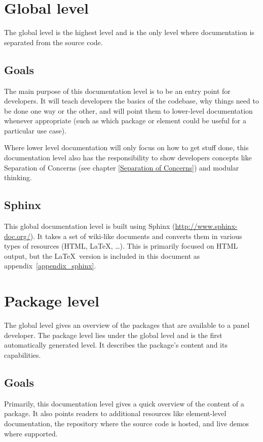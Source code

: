 \section{Global level}
The global level is the highest level and is the only level where documentation
is separated from the source code.

\subsection{Goals}
The main purpose of this documentation level is to be an entry point for developers.
It will teach developers the basics of the codebase, why things need to be done
one way or the other, and will point them to lower-level documentation whenever
appropriate (such as which package or element could be useful for a particular
use case).

Where lower level documentation will only focus on how to get stuff done, this
documentation level also has the responsibility to show developers concepts like
Separation of Concerns (see chapter \ref{Separation of Concerns}) and modular thinking.

\subsection{Sphinx}
This global documentation level is built using Sphinx (\url{http://www.sphinx-doc.org/}).
It takes a set of wiki-like documents and converts them in various types of
resources (HTML, \LaTeX, \ldots).
This is primarily focused on HTML output, but the \LaTeX~version is included in
this document as appendix~\ref{appendix_sphinx}.

\label{Sphinx}

\section{Package level}
The global level gives an overview of the packages that are available to a panel
developer.
The package level lies under the global level and is the first automatically
generated level. It describes the package's content and its capabilities.

\subsection{Goals}
Primarily, this documentation level gives a quick overview of the content of a
package. It also points readers to additional resources like element-level
documentation, the repository where the source code is hosted, and live demos
where supported.

